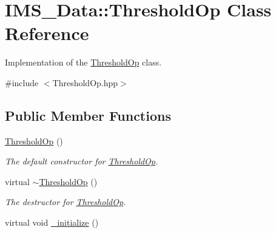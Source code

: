 \hypertarget{classIMS__Data_1_1ThresholdOp}{
\section{IMS\_\-Data::ThresholdOp Class Reference}
\label{classIMS__Data_1_1ThresholdOp}
}


Implementation of the \hyperlink{classIMS__Data_1_1ThresholdOp}{ThresholdOp} class.  




{\ttfamily \#include $<$ThresholdOp.hpp$>$}

\subsection*{Public Member Functions}
\begin{DoxyCompactItemize}
\item 
\hypertarget{classIMS__Data_1_1ThresholdOp_abc871edfdc61c32f1c1ae55677fff73b}{
\hyperlink{classIMS__Data_1_1ThresholdOp_abc871edfdc61c32f1c1ae55677fff73b}{ThresholdOp} ()}
\label{classIMS__Data_1_1ThresholdOp_abc871edfdc61c32f1c1ae55677fff73b}

\begin{DoxyCompactList}\small\item\em The default constructor for \hyperlink{classIMS__Data_1_1ThresholdOp}{ThresholdOp}. \item\end{DoxyCompactList}\item 
\hypertarget{classIMS__Data_1_1ThresholdOp_a64bd237cdd8e02bdd491e5e4fdc9c900}{
virtual \hyperlink{classIMS__Data_1_1ThresholdOp_a64bd237cdd8e02bdd491e5e4fdc9c900}{$\sim$ThresholdOp} ()}
\label{classIMS__Data_1_1ThresholdOp_a64bd237cdd8e02bdd491e5e4fdc9c900}

\begin{DoxyCompactList}\small\item\em The destructor for \hyperlink{classIMS__Data_1_1ThresholdOp}{ThresholdOp}. \item\end{DoxyCompactList}\item 
\hypertarget{classIMS__Data_1_1ThresholdOp_a3af1d163f0a8f7d91a319faec46b6545}{
virtual void \hyperlink{classIMS__Data_1_1ThresholdOp_a3af1d163f0a8f7d91a319faec46b6545}{\_\-initialize} ()}
\label{classIMS__Data_1_1ThresholdOp_a3af1d163f0a8f7d91a319faec46b6545}


\end{DoxyCompactItemize}
